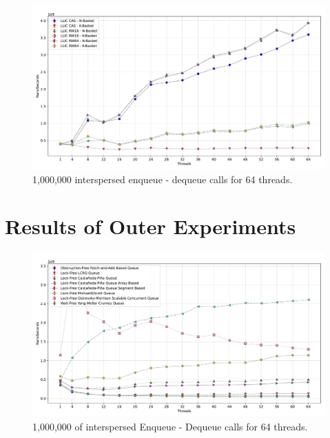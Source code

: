 \begin{figure}[ht]
  \centering
  \includegraphics[scale=0.4]{contents/backmatter/evaluation/64_inner_enq_deq_all.pdf}
  \caption{\label{fig:appx-64_inner_enq_deq_all} 1,000,000 interspersed enqueue - dequeue calls for 64 threads.}
\end{figure}




\section{\label{sec:appendix-outer-queue}Results of Outer Experiments}

\begin{figure}[ht]
  \centering
  \includegraphics[scale=0.4]{contents/backmatter/evaluation/64_outer_enq_deq_all.pdf}
  \caption{\label{fig:appx-64-outer-enq-deq}1,000,000 of interspersed Enqueue - Dequeue calls for 64 threads.}
\end{figure}







